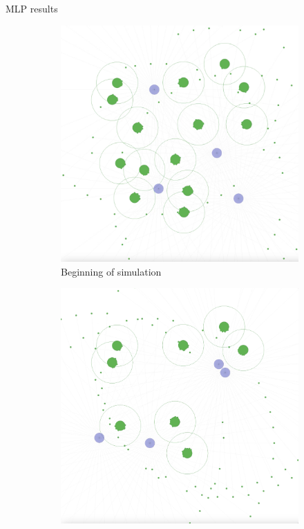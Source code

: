 \documentclass[presentation]{beamer}\mode<presentation>{\usetheme{AMSBolognaFC}}
\begin{document}
\begin{frame}[allowframebreaks]{MLP results}
	\begin{figure}
		\centering
		\begin{subfigure}[b]{0.45\textwidth}
			\centering
			\includegraphics[width=\textwidth]{img/4_agents_1.png}
			\caption{Beginning of simulation}
		\end{subfigure}
		\hfill
		\begin{subfigure}[b]{0.45\textwidth}
			\centering
			\includegraphics[width=\textwidth]{img/4_agents_2.png}

\end{subfigure}
\end{figure}
\end{frame}
\end{document}
